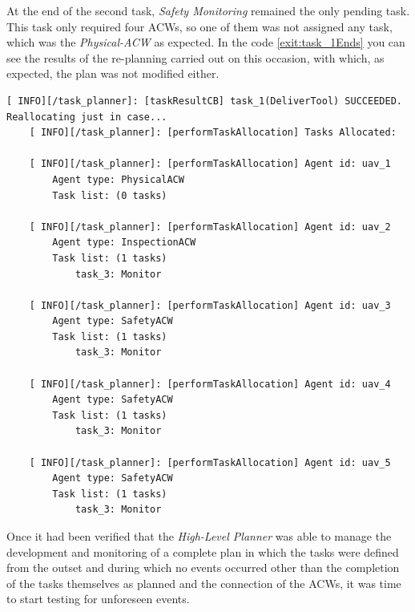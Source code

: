 At the end of the second task, \emph{Safety Monitoring} remained the only pending task. This task only required four \glspl{ACW}, so one of them was not assigned any task, which was the \emph{Physical-ACW} as expected. In the code \ref{exit:task_1Ends} you can see the results of the re-planning carried out on this occasion, with which, as expected, the plan was not modified either.

\begin{lstlisting}[caption={Feedback messages printed after the \emph{Tool Delivery} task ends}, breaklines=true, label=exit:task_1Ends]
    [ INFO][/task_planner]: [taskResultCB] task_1(DeliverTool) SUCCEEDED. Reallocating just in case...
    [ INFO][/task_planner]: [performTaskAllocation] Tasks Allocated:
    
    [ INFO][/task_planner]: [performTaskAllocation] Agent id: uav_1
        Agent type: PhysicalACW
        Task list: (0 tasks)
    
    [ INFO][/task_planner]: [performTaskAllocation] Agent id: uav_2
        Agent type: InspectionACW
        Task list: (1 tasks)
            task_3: Monitor
    
    [ INFO][/task_planner]: [performTaskAllocation] Agent id: uav_3
        Agent type: SafetyACW
        Task list: (1 tasks)
            task_3: Monitor
    
    [ INFO][/task_planner]: [performTaskAllocation] Agent id: uav_4
        Agent type: SafetyACW
        Task list: (1 tasks)
            task_3: Monitor
    
    [ INFO][/task_planner]: [performTaskAllocation] Agent id: uav_5
        Agent type: SafetyACW
        Task list: (1 tasks)
            task_3: Monitor
\end{lstlisting}


Once it had been verified that the \emph{High-Level Planner} was able to manage the development and monitoring of a complete plan in which the tasks were defined from the outset and during which no events occurred other than the completion of the tasks themselves as planned and the connection of the \glspl{ACW}, it was time to start testing for unforeseen events.

